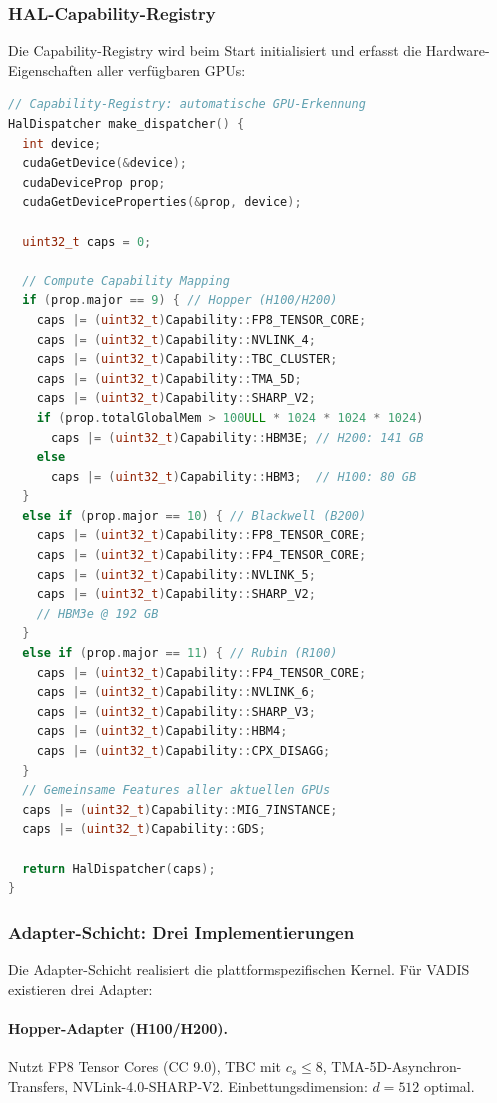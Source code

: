 ﻿\documentclass[12pt,a4paper]{article}
\begin{document}
\subsubsection{HAL-Capability-Registry}

Die Capability-Registry wird beim Start initialisiert
und erfasst die Hardware-Eigenschaften aller verfügbaren GPUs:

\begin{lstlisting}[language=C++, caption={Capability-Registry Initialisierung}]
// Capability-Registry: automatische GPU-Erkennung
HalDispatcher make_dispatcher() {
  int device;
  cudaGetDevice(&device);
  cudaDeviceProp prop;
  cudaGetDeviceProperties(&prop, device);
  
  uint32_t caps = 0;
  
  // Compute Capability Mapping
  if (prop.major == 9) { // Hopper (H100/H200)
    caps |= (uint32_t)Capability::FP8_TENSOR_CORE;
    caps |= (uint32_t)Capability::NVLINK_4;
    caps |= (uint32_t)Capability::TBC_CLUSTER;
    caps |= (uint32_t)Capability::TMA_5D;
    caps |= (uint32_t)Capability::SHARP_V2;
    if (prop.totalGlobalMem > 100ULL * 1024 * 1024 * 1024)
      caps |= (uint32_t)Capability::HBM3E; // H200: 141 GB
    else
      caps |= (uint32_t)Capability::HBM3;  // H100: 80 GB
  }
  else if (prop.major == 10) { // Blackwell (B200)
    caps |= (uint32_t)Capability::FP8_TENSOR_CORE;
    caps |= (uint32_t)Capability::FP4_TENSOR_CORE;
    caps |= (uint32_t)Capability::NVLINK_5;
    caps |= (uint32_t)Capability::SHARP_V2;
    // HBM3e @ 192 GB
  }
  else if (prop.major == 11) { // Rubin (R100)
    caps |= (uint32_t)Capability::FP4_TENSOR_CORE;
    caps |= (uint32_t)Capability::NVLINK_6;
    caps |= (uint32_t)Capability::SHARP_V3;
    caps |= (uint32_t)Capability::HBM4;
    caps |= (uint32_t)Capability::CPX_DISAGG;
  }
  // Gemeinsame Features aller aktuellen GPUs
  caps |= (uint32_t)Capability::MIG_7INSTANCE;
  caps |= (uint32_t)Capability::GDS;
  
  return HalDispatcher(caps);
}
\end{lstlisting}

\subsubsection{Adapter-Schicht: Drei Implementierungen}

Die Adapter-Schicht realisiert die plattformspezifischen Kernel.
Für VADIS existieren drei Adapter:

\paragraph{Hopper-Adapter (H100/H200).}
Nutzt FP8 Tensor Cores (CC 9.0), TBC mit $c_s \leq 8$,
TMA-5D-Asynchron-Transfers, NVLink-4.0-SHARP-V2.
Einbettungsdimension: $d = 512$ optimal.
\end{document}
